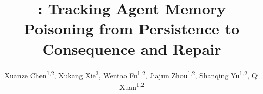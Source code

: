 \documentclass[letterpaper]{article}
\title{\model: Tracking Agent Memory Poisoning from Persistence to Consequence and Repair}
\author{
Xuanze Chen\textsuperscript{\rm 1,\rm 2},
Xukang Xie\textsuperscript{\rm 3},
Wentao Fu\textsuperscript{\rm 1,\rm 2},
Jiajun Zhou\textsuperscript{\rm 1,\rm 2}\corresponding,
Shanqing Yu\textsuperscript{\rm 1,\rm 2},
Qi Xuan\textsuperscript{\rm 1,\rm 2}
}
\newcommand{\model}{\textsc{MemSecBench}\xspace}
\begin{document}
\maketitle

\begin{abstract}

\end{abstract}
\end{document}
